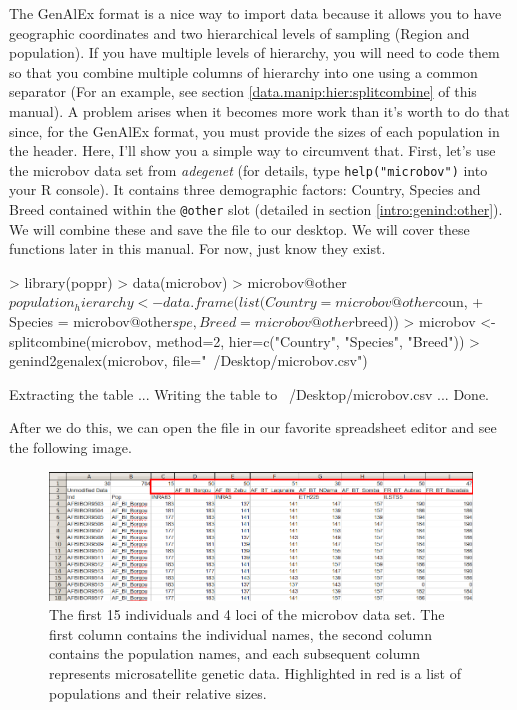 \documentclass[letterpaper]{article}
\newcommand{\tab}{\hspace*{1em}}
\begin{document}
\tab\tab The GenAlEx format is a nice way to import data because it allows you to have geographic coordinates and two hierarchical levels of sampling (Region and population). If you have multiple levels of hierarchy, you will need to code them so that you combine multiple columns of hierarchy into one using a common separator (For an example, see section \ref{data.manip:hier:splitcombine} of this manual). A problem arises when it becomes more work than it's worth to do that since, for the GenAlEx format, you must provide the sizes of each population in the header. Here, I'll show you a simple way to circumvent that. First, let's use the microbov data set from \textit{adegenet} (for details, type \texttt{help("microbov")} into your R console). It contains three demographic factors: Country, Species and Breed contained within the \texttt{@other} slot (detailed in section \ref{intro:genind:other}). We will combine these and save the file to our desktop. We will cover these functions later in this manual. For now, just know they exist.

\begin{Schunk}
\begin{Sinput}
> library(poppr)
> data(microbov)
> microbov@other$population_hierarchy <- data.frame(list(Country = microbov@other$coun, 
+   Species = microbov@other$spe, Breed = microbov@other$breed))
> microbov <- splitcombine(microbov, method=2, hier=c("Country", "Species", "Breed"))
> genind2genalex(microbov, file="~/Desktop/microbov.csv")
\end{Sinput}
\end{Schunk}
\begin{Schunk}
\begin{Soutput}
Extracting the table ... Writing the table to ~/Desktop/microbov.csv ... Done.
\end{Soutput}
\end{Schunk}
After we do this, we can open the file in our favorite spreadsheet editor and see the following image.


\begin{figure}[h!]
  \centering
  \caption{\footnotesize \footnotesize The first 15 individuals and 4 loci of the microbov data set. The first column contains the individual names, the second column contains the population names, and each subsequent column represents microsatellite genetic data. Highlighted in red is a list of populations and their relative sizes.}
  \label{microbov unmodified}
\includegraphics{unmod_dat}
\end{figure}
\end{document}
